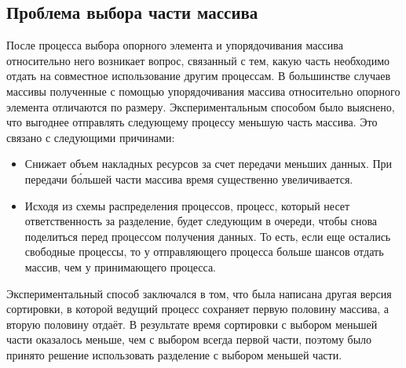 \documentclass{report}
\begin{document}
\subsection*{Проблема выбора части массива}
После процесса выбора опорного элемента и упорядочивания массива относительно него возникает вопрос, связанный с тем, какую часть необходимо отдать на совместное использование другим процессам. В большинстве случаев массивы полученные с помощью упорядочивания массива относительно опорного элемента отличаются по размеру. Экспериментальным способом было выяснено, что выгоднее отправлять следующему процессу меньшую часть массива. Это связано с следующими причинами:
\begin{itemize}
    \item Снижает объем накладных ресурсов за счет передачи меньших данных. При передачи б\'{о}льшей части массива время существенно увеличивается.
    \item Исходя из схемы распределения процессов, процесс, который несет ответственность за разделение, будет следующим в очереди, чтобы снова поделиться перед процессом получения данных. То есть, если еще остались свободные процессы, то у отправляющего процесса больше шансов отдать массив, чем у принимающего процесса.
\end{itemize}
\par Экспериментальный способ заключался в том, что была написана другая версия сортировки, в которой ведущий процесс сохраняет первую половину массива, а вторую половину отдаёт. В результате время сортировки с выбором меньшей части оказалось меньше, чем с выбором всегда первой части, поэтому было принято решение использовать разделение с выбором меньшей части.
\newpage
\end{document}
